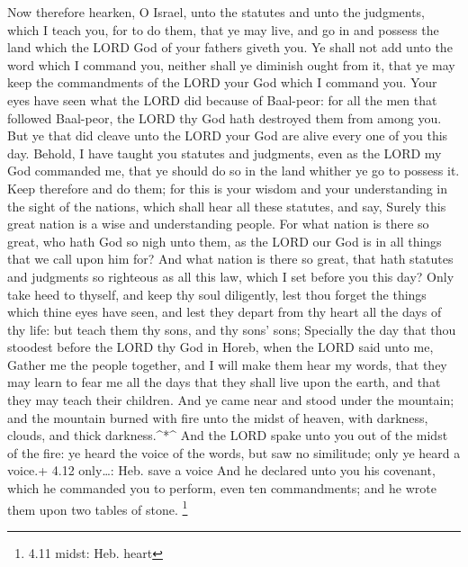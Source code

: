  Now therefore hearken, O Israel, unto the statutes and unto
the judgments, which I teach you, for to do them, that ye may live, and
go in and possess the land which the LORD God of your fathers giveth
you.  Ye shall not add unto the word which I command you,
neither shall ye diminish ought from it, that ye may keep the
commandments of the LORD your God which I command you.  Your
eyes have seen what the LORD did because of Baal-peor: for all the men
that followed Baal-peor, the LORD thy God hath destroyed them from among
you.  But ye that did cleave unto the LORD your God are
alive every one of you this day.  Behold, I have taught you
statutes and judgments, even as the LORD my God commanded me, that ye
should do so in the land whither ye go to possess it.  Keep
therefore and do them; for this is your wisdom and your understanding in
the sight of the nations, which shall hear all these statutes, and say,
Surely this great nation is a wise and understanding people.
 For what nation is there so great, who hath God so nigh
unto them, as the LORD our God is in all things that we call upon him
for?  And what nation is there so great, that hath statutes
and judgments so righteous as all this law, which I set before you this
day?  Only take heed to thyself, and keep thy soul
diligently, lest thou forget the things which thine eyes have seen, and
lest they depart from thy heart all the days of thy life: but teach them
thy sons, and thy sons' sons;  Specially the day that thou
stoodest before the LORD thy God in Horeb, when the LORD said unto me,
Gather me the people together, and I will make them hear my words, that
they may learn to fear me all the days that they shall live upon the
earth, and that they may teach their children.  And ye came
near and stood under the mountain; and the mountain burned with fire
unto the midst of heaven, with darkness, clouds, and thick
darkness.\^{}*\^{}  And the LORD spake unto you out of the
midst of the fire: ye heard the voice of the words, but saw no
similitude; only ye heard a voice.+ 4.12 only\ldots: Heb. save a voice
 And he declared unto you his covenant, which he commanded
you to perform, even ten commandments; and he wrote them upon two tables
of stone. \footnote{4.11 midst: Heb. heart}

